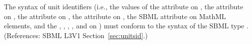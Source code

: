 The syntax of unit identifiers (i.e., the values of the 
attribute on \UnitDefinition, the  attribute on \Compartment,
the  attribute on \Parameter, the 
attribute on \Species, the SBML  attribute on MathML
 elements, and the , ,
, ,  and
 on \Model) must conform to the syntax of the SBML type
.  (References: SBML L3V1 Section~\ref{sec:unitsid}.)
